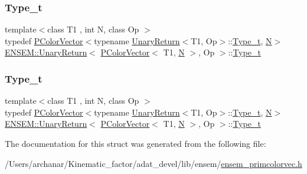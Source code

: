 \subsubsection{\texorpdfstring{Type\_t}{Type\_t}\hspace{0.1cm}{\footnotesize\ttfamily [1/2]}}
{\footnotesize\ttfamily template$<$class T1 , int N, class Op $>$ \\
typedef \mbox{\hyperlink{classENSEM_1_1PColorVector}{P\+Color\+Vector}}$<$typename \mbox{\hyperlink{structENSEM_1_1UnaryReturn}{Unary\+Return}}$<$T1, Op$>$\+::\mbox{\hyperlink{structENSEM_1_1UnaryReturn_3_01PColorVector_3_01T1_00_01N_01_4_00_01Op_01_4_a6f37cb5e1ae5f22c02017b613c6b7e24}{Type\+\_\+t}}, \mbox{\hyperlink{operator__name__util_8cc_a7722c8ecbb62d99aee7ce68b1752f337}{N}}$>$ \mbox{\hyperlink{structENSEM_1_1UnaryReturn}{E\+N\+S\+E\+M\+::\+Unary\+Return}}$<$ \mbox{\hyperlink{classENSEM_1_1PColorVector}{P\+Color\+Vector}}$<$ T1, \mbox{\hyperlink{operator__name__util_8cc_a7722c8ecbb62d99aee7ce68b1752f337}{N}} $>$, Op $>$\+::\mbox{\hyperlink{structENSEM_1_1UnaryReturn_3_01PColorVector_3_01T1_00_01N_01_4_00_01Op_01_4_a6f37cb5e1ae5f22c02017b613c6b7e24}{Type\+\_\+t}}}

\mbox{\label{structENSEM_1_1UnaryReturn_3_01PColorVector_3_01T1_00_01N_01_4_00_01Op_01_4_a6f37cb5e1ae5f22c02017b613c6b7e24}} 
\subsubsection{\texorpdfstring{Type\_t}{Type\_t}\hspace{0.1cm}{\footnotesize\ttfamily [2/2]}}
{\footnotesize\ttfamily template$<$class T1 , int N, class Op $>$ \\
typedef \mbox{\hyperlink{classENSEM_1_1PColorVector}{P\+Color\+Vector}}$<$typename \mbox{\hyperlink{structENSEM_1_1UnaryReturn}{Unary\+Return}}$<$T1, Op$>$\+::\mbox{\hyperlink{structENSEM_1_1UnaryReturn_3_01PColorVector_3_01T1_00_01N_01_4_00_01Op_01_4_a6f37cb5e1ae5f22c02017b613c6b7e24}{Type\+\_\+t}}, \mbox{\hyperlink{operator__name__util_8cc_a7722c8ecbb62d99aee7ce68b1752f337}{N}}$>$ \mbox{\hyperlink{structENSEM_1_1UnaryReturn}{E\+N\+S\+E\+M\+::\+Unary\+Return}}$<$ \mbox{\hyperlink{classENSEM_1_1PColorVector}{P\+Color\+Vector}}$<$ T1, \mbox{\hyperlink{operator__name__util_8cc_a7722c8ecbb62d99aee7ce68b1752f337}{N}} $>$, Op $>$\+::\mbox{\hyperlink{structENSEM_1_1UnaryReturn_3_01PColorVector_3_01T1_00_01N_01_4_00_01Op_01_4_a6f37cb5e1ae5f22c02017b613c6b7e24}{Type\+\_\+t}}}



The documentation for this struct was generated from the following file\+:\begin{DoxyCompactItemize}
\item 
/\+Users/archanar/\+Kinematic\+\_\+factor/adat\+\_\+devel/lib/ensem/\mbox{\hyperlink{lib_2ensem_2ensem__primcolorvec_8h}{ensem\+\_\+primcolorvec.\+h}}\end{DoxyCompactItemize}
